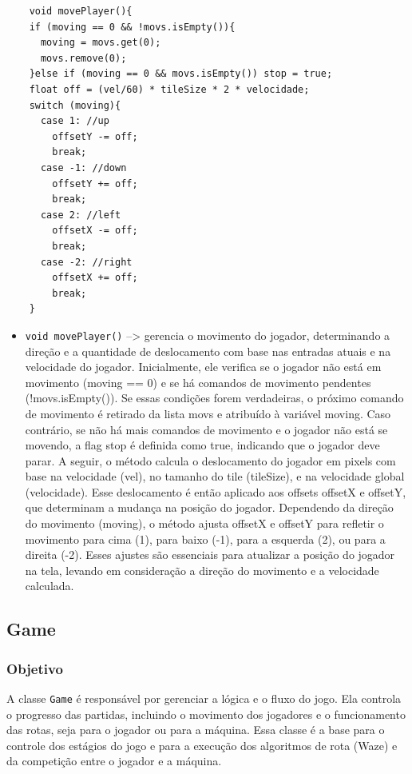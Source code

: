 \documentclass[
	12pt,				%
	oneside,			%
	a4paper,			%
	english,			%
	brazil,				%
	]{abntex2}
\begin{document}
{\begin{lstlisting}
    void movePlayer(){   
    if (moving == 0 && !movs.isEmpty()){
      moving = movs.get(0);
      movs.remove(0);
    }else if (moving == 0 && movs.isEmpty()) stop = true;
    float off = (vel/60) * tileSize * 2 * velocidade;
    switch (moving){
      case 1: //up
        offsetY -= off;
        break;
      case -1: //down
        offsetY += off;
        break;
      case 2: //left
        offsetX -= off;
        break;
      case -2: //right
        offsetX += off;
        break;
    }
\end{lstlisting}
\begin{itemize}
    \item \texttt{void movePlayer()} --> gerencia o movimento do jogador, determinando a direção e a quantidade de deslocamento com base nas entradas atuais e na velocidade do jogador. Inicialmente, ele verifica se o jogador não está em movimento (moving == 0) e se há comandos de movimento pendentes (!movs.isEmpty()). Se essas condições forem verdadeiras, o próximo comando de movimento é retirado da lista movs e atribuído à variável moving. Caso contrário, se não há mais comandos de movimento e o jogador não está se movendo, a flag stop é definida como true, indicando que o jogador deve parar.
    A seguir, o método calcula o deslocamento do jogador em pixels com base na velocidade (vel), no tamanho do tile (tileSize), e na velocidade global (velocidade). Esse deslocamento é então aplicado aos offsets offsetX e offsetY, que determinam a mudança na posição do jogador. Dependendo da direção do movimento (moving), o método ajusta offsetX e offsetY para refletir o movimento para cima (1), para baixo (-1), para a esquerda (2), ou para a direita (-2). Esses ajustes são essenciais para atualizar a posição do jogador na tela, levando em consideração a direção do movimento e a velocidade calculada.
\end{itemize}

\subsection{Game}

\subsubsection{Objetivo}
A classe \texttt{Game} é responsável por gerenciar a lógica e o fluxo do jogo. Ela controla o progresso das partidas, incluindo o movimento dos jogadores e o funcionamento das rotas, seja para o jogador ou para a máquina. Essa classe é a base para o controle dos estágios do jogo e para a execução dos algoritmos de rota (Waze) e da competição entre o jogador e a máquina.

}
\end{document}

